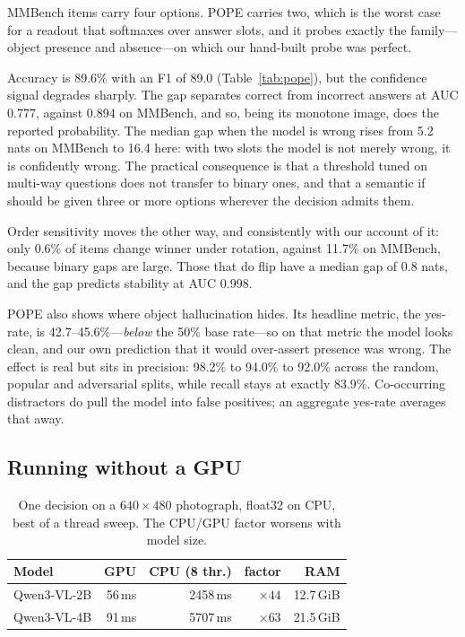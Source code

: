 \documentclass[10pt,twocolumn]{article}
\begin{document}
MMBench items carry four options. POPE \cite{li2023pope} carries two, which is
the worst case for a readout that softmaxes over answer slots, and it probes
exactly the family---object presence and absence---on which our hand-built
probe was perfect.

Accuracy is 89.6\% with an F1 of 89.0 (Table~\ref{tab:pope}), but the
confidence signal degrades sharply. The gap separates correct from incorrect
answers at AUC 0.777, against 0.894 on MMBench, and so, being its monotone
image, does the reported probability. The median gap when the model is wrong
rises from 5.2 nats on MMBench to 16.4 here: with two slots the
model is not merely wrong, it is confidently wrong. The practical consequence
is that a threshold tuned on multi-way questions does not transfer to binary
ones, and that a semantic if should be given three or more options wherever the
decision admits them.

Order sensitivity moves the other way, and consistently with our account of it:
only 0.6\% of items change winner under rotation, against 11.7\% on MMBench,
because binary gaps are large. Those that do flip have a median gap of 0.8
nats, and the gap predicts stability at AUC 0.998.

POPE also shows where object hallucination hides. Its headline metric, the
yes-rate, is 42.7--45.6\%---\emph{below} the 50\% base rate---so on that metric
the model looks clean, and our own prediction that it would over-assert
presence was wrong. The effect is real but sits in precision: 98.2\% to 94.0\%
to 92.0\% across the random, popular and adversarial splits, while recall stays
at exactly 83.9\%. Co-occurring distractors do pull the model into false
positives; an aggregate yes-rate averages that away.

\subsection{Running without a GPU}
\label{sec:cpu}

\begin{table}[t]
\centering\small
\caption{One decision on a $640\times480$ photograph, float32 on CPU, best of a
thread sweep. The CPU/GPU factor worsens with model size.}
\label{tab:cpu}
\begin{tabular}{lrrrr}
\toprule
Model & GPU & CPU (8 thr.) & factor & RAM \\
\midrule
Qwen3-VL-2B & 56\,ms & 2458\,ms & $\times 44$ & 12.7\,GiB \\
Qwen3-VL-4B & 91\,ms & 5707\,ms & $\times 63$ & 21.5\,GiB \\
\bottomrule
\end{tabular}
\end{table}
\end{document}
